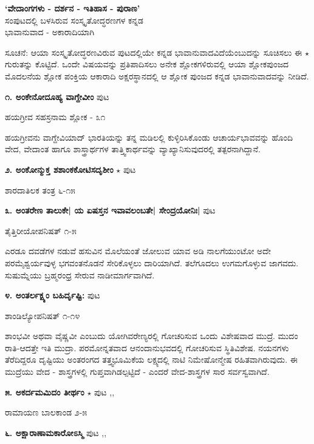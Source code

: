 \begin{center}
\medskip
\noindent\textbf{\large `ವೇದಾಂಗಗಳು - ದರ್ಶನ - ಇತಿಹಾಸ - ಪುರಾಣ'}\\
\large{ಸಂಪುಟದಲ್ಲಿ ಬಳಸಿರುವ ಸಂಸ್ಕೃತೋದ್ಧರಣಗಳ ಕನ್ನಡ}\\
\large{ಭಾವಾನುವಾದ - ಅಕಾರಾದಿಯಾಗಿ}
\end{center}

ಸೂಚನೆ: ಆಯಾ ಸಂಸ್ಕೃತೋದ್ಧರಣವಿರುವ ಪುಟದಲ್ಲಿಯೇ ಕನ್ನಡ ಭಾವಾನುವಾದವಿದೆಯೆಂಬುದನ್ನು ಸೂಚಿಸಲು ಈ  $\star$ ಗುರುತನ್ನು ಕೊಟ್ಟಿದೆ. ಒಂದೇ ವಿಷಯವನ್ನು ಪ್ರತಿಪಾದಿಸಲು ಅನೇಕ ಶ್ಲೋಕಗಳಿರುವಲ್ಲಿ ಆಯಾ ಶ್ಲೋಕಪುಂಜದ ಮೊದಲನೆಯ ಶ್ಲೋಕ ಪಂಕ್ತಿಯ ಆಕಾರಾದಿ ಅಕ್ಷರಸ್ಥಾನದಲ್ಲಿ ಆ ಶ್ಲೋಕ ಪುಂಜದ ಕನ್ನಡ ಭಾವಾನುವಾದವನ್ನು ನೀಡಿದೆ.

\medskip
\medskip
\noindent\textbf{೧. ಅಂಕೇನೋದೂಹ್ಯ ವಾಗ್ದೇವೀಂ} \hfill ಪುಟ \pageref{32}

\hfill ಹಯಗ್ರೀವ ಸಹಸ್ರನಾಮ ಶ್ಲೋಕ - ೩೧

ಹಯಗ್ರೀವನು ವಾಗ್ದೇವಿಯಾದ್ ಭಾರತಿಯನ್ನು ತನ್ನ ಮಡಿಲಲ್ಲಿ ಕುಳ್ಳಿರಿಸಿಕೊಂಡು ಆಚಾರ್ಯಭಾವವನ್ನು ಹೊಂದಿ ವೇದ, ವೇದಾಂತ ಹಾಗೂ ಶಾಸ್ತ್ರಾರ್ಥಗಳ ತಾತ್ತ್ವಿಕಾರ್ಥವನ್ನು ವ್ಯಾಖ್ಯಾನಿಸುವುದರಲ್ಲಿ ತತ್ಪರನಾಗಿದ್ದಾನೆ.

\medskip
\noindent\textbf{೨. ಅಂಕೋನ್ಮುಕ್ತ ಶಶಾಂಕಕೋಟಿಸದೃಶೀಂ} $\star$ \hfill ಪುಟ \pageref{31a}

\hfill ಶಾರದಾತಿಲಕ ತಂತ್ರ ೬-೧೫

\medskip
\noindent\textbf{೩. ಅಂತರೇಣ ತಾಲುಕೇ| ಯ ಏಷಸ್ತನ ಇವಾವಲಂಬತೇ| ಸೇಂದ್ರಯೋನಿಃ|} \hfill ಪುಟ \pageref{26}

\hfill ತೈತ್ತಿರೀಯೋಪನಿಷತ್ ೧-೫

ಎರಡೂ ದವಡೆಗಳ ನಡುವೆ ಹಸುವಿನ ಮೊಲೆಯಂತೆ ಜೋಲುವ ಯಾವ ಅಡಿ ನಾಲಗೆಯುಂಟೋ ಅದೇ ಪರಮೈಶ್ವರ್ಯವುಳ್ಳ ಭಗವಂತನೊಡನೆ ಸೇರಿಕೊಳ್ಳಲು ದಾರಿಯಾಗಿದೆ. ತಲೆಗೂದಲು ಉಗಮಗೊಳ್ಳುವ ಜಾಗವದು. ಸುಷುಮ್ನೆಯು ಬ್ರಹ್ಮರಂಧ್ರ ಸೇರುವ ನಾಡೀಮಾರ್ಗವಾಗಿದೆ.

\medskip
\noindent\textbf{೪. ಅಂತರ್ಲಕ್ಷ್ಯಂ ಬಹಿರ್ದೃಷ್ಟಿ:} \hfill ಪುಟ \pageref{244}

\hfill ಶಾಂಡಿಲ್ಯೋಪನಿಷತ್ ೧-೧೪

ಶಾಂಭವೀ ಅಥವಾ ವೈಷ್ಣವೀ ಎಂಬುದು ಯೋಗಿವರೇಣ್ಯರಲ್ಲಿ ಗೋಚರಿಸುವ ಒಂದು ವಿಶೇಷವಾದ ಮುದ್ರೆ. ಮುದಂ ರಾತಿ-ಆದತ್ತೇ ಇತಿ ಮುದ್ರಾ. ಪರಮೋನ್ನತವಾದ ಆನಂದಾನುಭವದಲ್ಲಿ ಗೋಚರಿಸುವ ಸ್ಥಿತಿವಿಶೇಷ. ನಯನಗಳು ತೆರೆದಿದ್ದರೂ ದೃಷ್ಟಿಯು ಅಂತರಂಗದ ತತ್ತ್ವಭೂಮಿಕೆಯ ಲಕ್ಷ್ಯದಲ್ಲಿ ನಾಟಿ ನಿಮೇಷೋನ್ಮೇಷ ರಹಿತವಾಗಿರುವುದು. ಈ ಮುದ್ರೆಯು ವೇದ - ಶಾಸ್ತ್ರಗಳಲ್ಲಿ ಗುಪ್ತವಾಗಿಡಲ್ಪಟ್ಟಿದೆ - ಎಂದರೆ ವೇದ-ಶಾಸ್ತ್ರಗಳ ಸಾರ ಸರ್ವಸ್ವವಾಗಿದೆ.

\medskip
\noindent\textbf{೫. ಅಕರ್ದಮಮಿದಂ ತೀರ್ಥಂ } $\star$ \hfill ಪುಟ \pageref{156},\pageref{164},\pageref{175}

\hfill ರಾಮಾಯಣ ಬಾಲಕಾಂಡ ೨-೫

\medskip
\noindent\textbf{೬. ಅಕ್ಷಾರಾಣಾಮಕಾರೋಽಸ್ಮಿ } \hfill ಪುಟ \pageref{93c},\pageref{95},\pageref{97}

